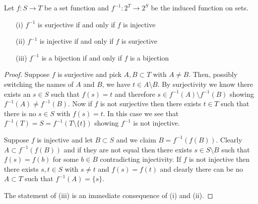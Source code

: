 \begin{lem}\label{BijectivityOfInducedSetMap}Let $f : S \to T$ be a set function and $f^{-1} : 2^T \to
  2^S$ be the induced function on sets.
\begin{itemize}
\item[(i)]$f^{-1}$ is surjective if and only if $f$ is injective
\item[(ii)]$f^{-1}$ is injective if and only if $f$ is surjective
\item[(iii)]$f^{-1}$ is a bijection if and only if $f$ is a bijection
\end{itemize}
\end{lem}
\begin{proof}
Suppose $f$ is surjective and pick $A, B \subset T$ with $A \neq B$.
Then, possibly switching the names of $A$ and $B$, we have $t \in A
\setminus B$.  By surjectivity we know there exists an $s \in S$ such
that $f(s) = t$ and therefore $s \in f^{-1}(A) \setminus f^{-1}(B)$
showing $ f^{-1}(A) \neq f^{-1}(B)$.  Now if $f$ is not surjective
then there exists $t \in T$ such that there is no $s \in S$ with $f(s)
= t$.  In this case we see that $f^{-1}(T) = S = f^{-1}(T \setminus
\lbrace t \rbrace)$ showing $f^{-1}$ is not injective.

Suppose $f$ is injective and let $B \subset S$ and we claim $B =
f^{-1}(f(B))$.  Clearly $A \subset f^{-1}(f(B))$ and if they are not
equal then there exists $s \in S \setminus B$ such that $f(s) = f(b)$
for some $b \in B$ contradicting injectivity.  If $f$ is not injective
then there exists $s,t \in S$ with $s \neq t$ and $f(s) = f(t)$ and
clearly there can be no $A \subset T$ such that $f^{-1}(A) = \lbrace s \rbrace$.

The statement of (iii) is an immediate consequence of (i) and (ii).
\end{proof}

